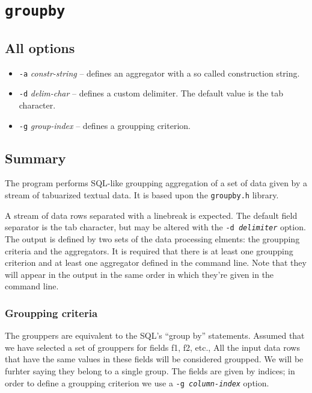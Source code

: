 
\section{\texttt{groupby}}

	\subsection{All options}
	\begin{itemize}
		\item \texttt{-a} \textit{constr-string} -- defines an aggregator with a
			so called construction string.
		\item \texttt{-d} \textit{delim-char} -- defines a custom delimiter.
			The default value is the tab character.
		\item \texttt{-g} \textit{group-index} -- defines a groupping criterion.
	\end{itemize}

	\subsection{Summary}
	The program performs SQL-like groupping aggregation of a set of data given by a
	stream of tabuarized textual data. It is based upon the \texttt{groupby.h} library.

	A stream of data rows separated with a linebreak is expected. The default
	field separator is the tab character, but may be altered with the
	\texttt{-d \textit{delimiter}} option. The output is defined by two sets
	of the data processing elments: the groupping criteria and the aggregators.
	It is required that there is at least one groupping criterion and at least one
	aggregator defined in the command line. Note that they will appear in the output
	in the same order in which they're given in the command line.

	\subsubsection{Groupping criteria}
	The grouppers are equivalent to the SQL's ``group by'' statements.
	Assumed that we have selected a set of grouppers for fields f1, f2, etc.,
	All the input data rows that have the same values in these fields will be
	considered groupped. We will be furhter saying they belong to a single group.
	The fields are given by indices; in order to define a groupping criterion we use
	a \texttt{-g \textit{column-index}} option.

